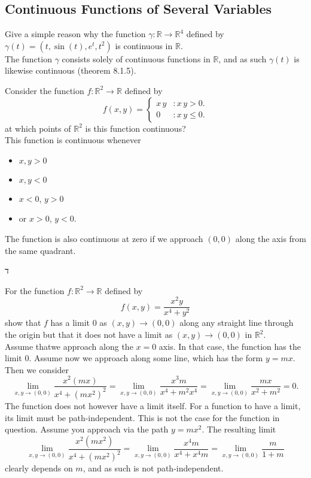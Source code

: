 \documentclass[12pt]{book}
\newcommand{\R}{\mathbb{R}}
\newenvironment{exercise}[2][Exercise]{\begin{trivlist}
\item[\hskip \labelsep {\bfseries #1}\hskip \labelsep {\bfseries #2.}]}{\end{trivlist}}
\begin{document}
\begin{exercise}{7.2.7}
\section{Continuous Functions of Several Variables}


\begin{exercise}{8.1.2}
Give a simple reason why the function $\gamma : \R \to \R^4 $ defined by $\gamma (t) = \left( t, \sin(t), e^t, t^2 \right) $ is continuous in $\R$. \\

The function $\gamma$ consists solely of continuous functions in $\R$, and as such $\gamma(t)$ is likewise continuous (theorem 8.1.5).
\end{exercise}


\begin{exercise}{8.1.4}
Consider the function $f:\R^2  \to \R $ defined by
    \[ f(x,y) = \left\{
     \begin{array}{lr}
       x \, y & : x \, y > 0.\\
       0 & : x \, y \leq 0.
     \end{array}
   \right. \]
   at which points of $\R^2$ is this function continuous? \\


    This function is continuous whenever
    \begin{itemize}
        \item $x,y >0$
        \item $x,y < 0$
        \item $x < 0$, $y > 0$
        \item or $x > 0$, $y < 0.$
    \end{itemize}
    The function is also continuous at zero if we approach $(0,0)$ along the axis from the same quadrant.
\end{exercise}
ד


\begin{exercise}{8.1.5}
For the function  $f : \R^2 \to \R$ defined by
    \[ f(x,y) = \frac{x^2 y}{x^4 + y^2} \]
show that $f$ has a limit $0$ as $(x,y) \to (0,0)$ along any straight line through the origin but that it does not have a limit as $(x,y)\to (0,0)$ in $\R^2$. \\

Assume thatwe approach along the $x = 0$ axis. In that case, the function has the limit $0$. Assume now we approach along some line, which has the form $ y = m x$. Then we consider
    \[ \lim_{x,y \to (0,0)} \frac{x^2  (mx)}{x^4 + (m x^2)^2} = \lim_{x,y \to (0,0)} \frac{x^3 m}{x^4 + m^2 x^4} = \lim_{x,y \to (0,0)} \frac{m x}{x^2 + m^2} = 0.\]
    The function does not however have a limit itself. For a function to have a limit, its limit must be path-independent. This is not the case for the function in question. Assume you approach via the path $y = m x^2$. The resulting limit
        \[ \lim_{x,y \to (0,0)} \frac{x^2 (mx^2)}{x^4 + (mx^2)^2} = \lim_{x,y \to (0,0)} \frac{x^4 m}{x^4 + x^4 m} = \lim_{x,y \to (0,0)} \frac{m}{1 + m}  \]
    clearly depends on $m$, and as such is not path-independent.
\end{exercise}




\end{exercise}
\end{document}
